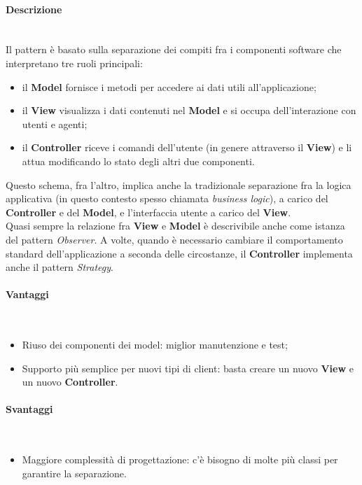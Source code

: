 \paragraph{Descrizione} \mbox{} \\
Il pattern è basato sulla separazione dei compiti fra i componenti software che interpretano tre ruoli principali:
\begin{itemize}
\item il \textbf{Model} fornisce i metodi per accedere ai dati utili all'applicazione;
\item il \textbf{View} visualizza i dati contenuti nel \textbf{Model} e si occupa dell'interazione con utenti e agenti;
\item il \textbf{Controller} riceve i comandi dell'utente (in genere attraverso il \textbf{View}) e li attua modificando lo stato degli altri due componenti.
\end{itemize}
Questo schema, fra l'altro, implica anche la tradizionale separazione fra la logica applicativa (in questo contesto spesso chiamata \textit{business logic}), a carico del \textbf{Controller} e del \textbf{Model}, e l'interfaccia utente a carico del \textbf{View}. \\
Quasi sempre la relazione fra \textbf{View} e \textbf{Model} è descrivibile anche come istanza del pattern \textit{Observer}. A volte, quando è necessario cambiare il comportamento standard dell'applicazione a seconda delle circostanze, il \textbf{Controller} implementa anche il pattern \textit{Strategy}.
\paragraph{Vantaggi} \mbox{} \\
\begin{itemize}
\item Riuso dei componenti dei model: miglior manutenzione e test;
\item Supporto più semplice per nuovi tipi di client: basta creare un nuovo \textbf{View} e un nuovo \textbf{Controller}.
\end{itemize}
\paragraph{Svantaggi} \mbox{} \\
\begin{itemize}
\item Maggiore complessità di progettazione: c'è bisogno di molte più classi per garantire la separazione.
\end{itemize}
